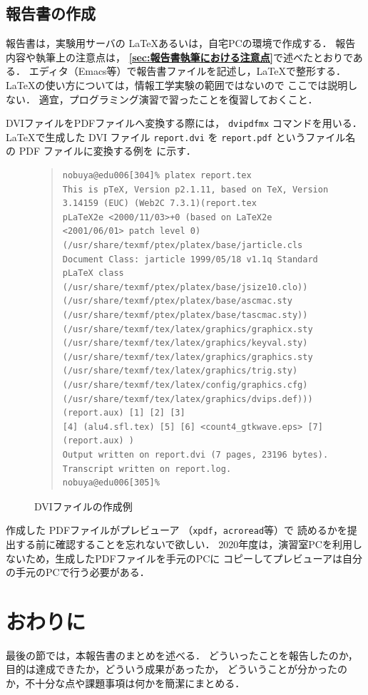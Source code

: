 \documentclass{jarticle}[11pt]
\newcommand{\figref}[1]{\makebox{図~\ref{#1}}}
\begin{document}
\subsection{報告書の作成}
報告書は，実験用サーバの \LaTeX あるいは，自宅PCの環境で作成する．
報告内容や執筆上の注意点は，
{\bf \ref{sec:報告書執筆における注意点}}で述べたとおりである．
エディタ（Emacs等）で報告書ファイルを記述し，\LaTeX で整形する．
\LaTeX の使い方については，情報工学実験の範囲ではないので
ここでは説明しない．
適宜，プログラミング演習で習ったことを復習しておくこと．

DVIファイルをPDFファイルへ変換する際には，
\verb|dvipdfmx| コマンドを用いる．
\LaTeX で生成した DVI ファイル \verb|report.dvi| を
\verb|report.pdf| というファイル名の PDF ファイルに変換する例を
\figref{fig:DVIファイルの作成例}に示す．
\begin{figure}[htb]
{\small
\begin{quote}
\begin{verbatim}
nobuya@edu006[304]% platex report.tex
This is pTeX, Version p2.1.11, based on TeX, Version 3.14159 (EUC) (Web2C 7.3.1)(report.tex
pLaTeX2e <2000/11/03>+0 (based on LaTeX2e <2001/06/01> patch level 0)
(/usr/share/texmf/ptex/platex/base/jarticle.cls
Document Class: jarticle 1999/05/18 v1.1q Standard pLaTeX class
(/usr/share/texmf/ptex/platex/base/jsize10.clo))
(/usr/share/texmf/ptex/platex/base/ascmac.sty
(/usr/share/texmf/ptex/platex/base/tascmac.sty))
(/usr/share/texmf/tex/latex/graphics/graphicx.sty
(/usr/share/texmf/tex/latex/graphics/keyval.sty)
(/usr/share/texmf/tex/latex/graphics/graphics.sty
(/usr/share/texmf/tex/latex/graphics/trig.sty)
(/usr/share/texmf/tex/latex/config/graphics.cfg)
(/usr/share/texmf/tex/latex/graphics/dvips.def))) (report.aux) [1] [2] [3]
[4] (alu4.sfl.tex) [5] [6] <count4_gtkwave.eps> [7] (report.aux) )
Output written on report.dvi (7 pages, 23196 bytes).
Transcript written on report.log.
nobuya@edu006[305]%
\end{verbatim}
\end{quote}
} %
\caption{DVIファイルの作成例}
\label{fig:DVIファイルの作成例}
\end{figure}
作成した PDFファイルがプレビューア （\verb|xpdf|，\verb|acroread|等）で
読めるかを提出する前に確認することを忘れないで欲しい．
2020年度は，演習室PCを利用しないため，生成したPDFファイルを手元のPCに
コピーしてプレビューアは自分の手元のPCで行う必要がある．


\section{おわりに}
\label{sec:おわりに}
最後の節では，本報告書のまとめを述べる．
どういったことを報告したのか，目的は達成できたか，どういう成果があったか，
どういうことが分かったのか，不十分な点や課題事項は何かを簡潔にまとめる．
\end{document}
